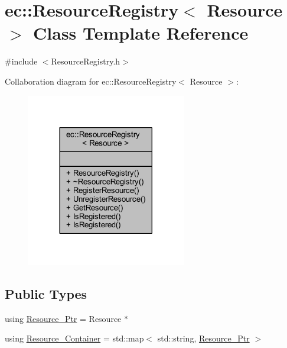 \hypertarget{classec_1_1_resource_registry}{}\section{ec\+:\+:Resource\+Registry$<$ Resource $>$ Class Template Reference}
\label{classec_1_1_resource_registry}


{\ttfamily \#include $<$Resource\+Registry.\+h$>$}



Collaboration diagram for ec\+:\+:Resource\+Registry$<$ Resource $>$\+:
\nopagebreak
\begin{figure}[H]
\begin{center}
\leavevmode
\includegraphics[width=197pt]{classec_1_1_resource_registry__coll__graph}
\end{center}
\end{figure}
\subsection*{Public Types}
\begin{DoxyCompactItemize}
\item 
using \mbox{\hyperlink{classec_1_1_resource_registry_a77cf5381229bff47d251603c783115fe}{Resource\+\_\+\+Ptr}} = Resource $\ast$
\item 
using \mbox{\hyperlink{classec_1_1_resource_registry_a0a2b5090a2bbc638a04a2c283812b956}{Resource\+\_\+\+Container}} = std\+::map$<$ std\+::string, \mbox{\hyperlink{classec_1_1_resource_registry_a77cf5381229bff47d251603c783115fe}{Resource\+\_\+\+Ptr}} $>$
\end{DoxyCompactItemize}
